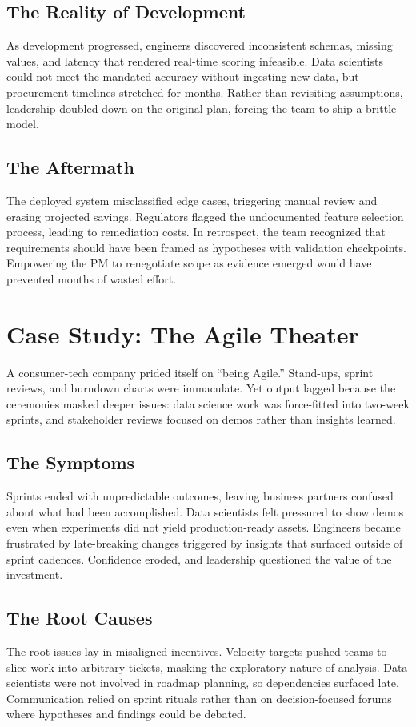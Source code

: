 \subsection{The Reality of Development}
As development progressed, engineers discovered inconsistent schemas, missing values, and latency that rendered real-time scoring infeasible. Data scientists could not meet the mandated accuracy without ingesting new data, but procurement timelines stretched for months. Rather than revisiting assumptions, leadership doubled down on the original plan, forcing the team to ship a brittle model.

\subsection{The Aftermath}
The deployed system misclassified edge cases, triggering manual review and erasing projected savings. Regulators flagged the undocumented feature selection process, leading to remediation costs. In retrospect, the team recognized that requirements should have been framed as hypotheses with validation checkpoints. Empowering the PM to renegotiate scope as evidence emerged would have prevented months of wasted effort.

\section{Case Study: The Agile Theater}
\label{sec:case-agile-theater}

A consumer-tech company prided itself on ``being Agile.'' Stand-ups, sprint reviews, and burndown charts were immaculate. Yet output lagged because the ceremonies masked deeper issues: data science work was force-fitted into two-week sprints, and stakeholder reviews focused on demos rather than insights learned.

\subsection{The Symptoms}
Sprints ended with unpredictable outcomes, leaving business partners confused about what had been accomplished. Data scientists felt pressured to show demos even when experiments did not yield production-ready assets. Engineers became frustrated by late-breaking changes triggered by insights that surfaced outside of sprint cadences. Confidence eroded, and leadership questioned the value of the investment.

\subsection{The Root Causes}
The root issues lay in misaligned incentives. Velocity targets pushed teams to slice work into arbitrary tickets, masking the exploratory nature of analysis. Data scientists were not involved in roadmap planning, so dependencies surfaced late. Communication relied on sprint rituals rather than on decision-focused forums where hypotheses and findings could be debated.

